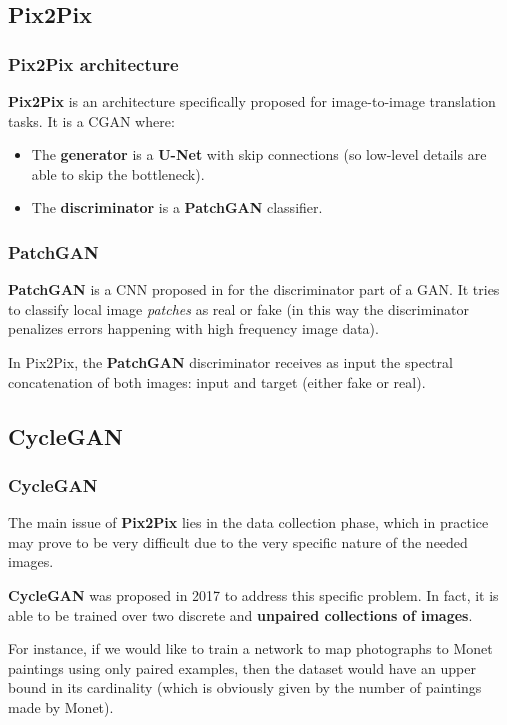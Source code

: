 
\subsection{Pix2Pix}

\begin{frame}
    \frametitle{Pix2Pix architecture}
    \textbf{Pix2Pix} \cite{pix2pix} is an architecture specifically proposed for image-to-image translation tasks. It is a CGAN where:
    \begin{itemize}
        \item The \textbf{generator} is a \textbf{U-Net} with skip connections (so low-level details are able to skip the bottleneck).
        \item The \textbf{discriminator} is a \textbf{PatchGAN} classifier.
    \end{itemize}
\end{frame}

\begin{frame}
    \frametitle{PatchGAN}
    \textbf{PatchGAN} is a CNN proposed in \cite{pix2pix} for the discriminator part of a GAN. It tries to classify local image \emph{patches} as real or fake (in this way the discriminator penalizes errors happening with high frequency image data).

    In Pix2Pix, the \textbf{PatchGAN} discriminator receives as input the spectral concatenation of both images: input and target (either fake or real).
\end{frame}

\subsection{CycleGAN}

\begin{frame}
    \frametitle{CycleGAN}
    The main issue of \textbf{Pix2Pix} lies in the data collection phase, which in practice may prove to be very difficult due to the very specific nature of the needed images.

    \textbf{CycleGAN} \cite{cyclegan} was proposed in 2017 to address this specific problem. In fact, it is able to be trained over two discrete and \textbf{unpaired collections of images}.


    For instance, if we would like to train a network to map photographs to Monet paintings using only paired examples, then the dataset would have an upper bound in its cardinality (which is obviously given by the number of paintings made by Monet).
\end{frame}

